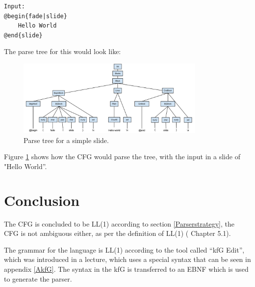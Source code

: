 \begin{lstlisting}[frame=single]
Input:
@begin{fade|slide}
    Hello World
@end{slide}
\end{lstlisting}

The parse tree for this would look like: 

\begin{figure}[! h]
\centering
	 \includegraphics[width=350px]{images/ebnfexample.png}
		 \caption{Parse tree for a simple slide.}	
	\label{fig:Parsetree}
\end{figure}
Figure \ref{fig:Parsetree} shows how the CFG would parse the tree, with the input in a slide of "Hello World''. 

\section{Conclusion}
The CFG is concluded to be LL(1) according to section \ref{Parserstrategy}, the CFG is not ambiguous either, as per the definition of LL(1) (\cite{CaC} Chapter 5.1).

The grammar for the language is LL(1) according to the tool called ``kfG Edit'', which was introduced in a lecture, which uses a special syntax that can be seen in appendix \ref{AkfG}. The syntax in the kfG is transferred to an EBNF which is used to generate the parser.